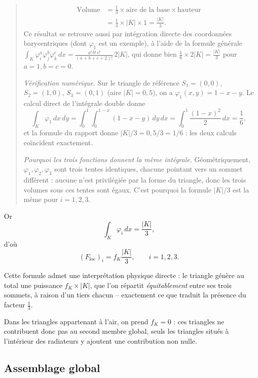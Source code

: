 \documentclass[12pt,a4paper]{article}
\begin{document}
	\begin{quote}
		
		\[
		\begin{aligned}
			\text{Volume}&=\frac{1}{3}\times\text{aire de la base}\times\text{hauteur}\\
			&=\frac{1}{3}\times|K|\times 1=\frac{|K|}{3}.
		\end{aligned}
		\]
		Ce résultat se retrouve aussi par intégration directe des coordonnées barycentriques (dont $\varphi_1$ est un exemple), à l'aide de la formule générale $\int_K\varphi_i^a\varphi_j^b\varphi_k^c\,dx=\frac{a!\,b!\,c!}{(a+b+c+2)!}\,2|K|$, qui donne bien $\frac{1}{6}\times2|K|=\frac{|K|}{3}$ pour $a=1,b=c=0$.
		
		\emph{Vérification numérique.} Sur le triangle de référence $S_1=(0,0)$, $S_2=(1,0)$, $S_3=(0,1)$ (aire $|K|=0{,}5$), on a $\varphi_1(x,y)=1-x-y$. Le calcul direct de l'intégrale double donne
		\[
		\int_K\varphi_1\,dx\,dy=\int_0^1\!\!\int_0^{1-x}(1-x-y)\,dy\,dx=\int_0^1\frac{(1-x)^2}{2}\,dx=\frac{1}{6},
		\]
		et la formule du rapport donne $|K|/3=0{,}5/3=1/6$ : les deux calculs coïncident exactement.
		
		\emph{Pourquoi les trois fonctions donnent la même intégrale.} Géométriquement, $\varphi_1,\varphi_2,\varphi_3$ sont trois tentes identiques, chacune pointant vers un sommet différent : aucune n'est privilégiée par la forme du triangle, donc les trois volumes sous ces tentes sont égaux. C'est pourquoi la formule $|K|/3$ est la même pour $i=1,2,3$.
	\end{quote}
	
	Or
	\[
	\int_K\varphi_i\,dx=\frac{|K|}{3},
	\]
	d'où
	\[
	(F_{\mathrm{loc}})_i
	=
	f_K\frac{|K|}{3},
	\qquad i=1,2,3.
	\]
	
	Cette formule admet une interprétation physique directe : le triangle génère au total une puissance $f_K\times|K|$, que l'on répartit \emph{équitablement} entre ses trois sommets, à raison d'un tiers chacun -- exactement ce que traduit la présence du facteur $\tfrac13$.
	
	Dans les triangles appartenant à l'air, on prend $f_K=0$ : ces triangles ne contribuent donc pas au second membre global, seuls les triangles situés à l'intérieur des radiateurs y ajoutent une contribution non nulle.
	
	\subsection{Assemblage global}
	
\end{document}
